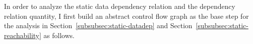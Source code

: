 %
%
In order to analyze the static data dependency relation and the dependency relation quantity,
I first build an abstract control flow graph as the base step for the analysis in Section~\ref{subsubsec:static-datadep}
and Section~\ref{subsubsec:static-reachability} as follows.
